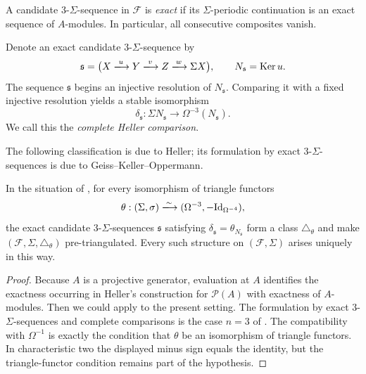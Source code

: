 \documentclass[a4paper,reqno,10pt]{amsart}
\numberwithin{equation}{section}
\newcommand{\cF}{\mathcal F}
\begin{document}
\begin{definition}
\label{def:complete-comparison}
A candidate $3$-$\Sigma$-sequence in $\cF$ is \emph{exact} if its
$\Sigma$-periodic continuation is an exact sequence of $A$-modules. In
particular, all consecutive composites vanish.

Denote an exact candidate
$3$-$\Sigma$-sequence by
\[
 \mathfrak s=
 \bigl(X\xlongrightarrow{u}Y\xlongrightarrow{v}Z
 \xlongrightarrow{w}\Sigma X\bigr),
 \qquad N_{\mathfrak s}=\operatorname{Ker}u.
\]
The sequence $\mathfrak s$ begins an injective resolution of
$N_{\mathfrak s}$. Comparing it with a fixed injective resolution yields a
stable isomorphism
\[
  \delta_{\mathfrak s}:\Sigma N_{\mathfrak s}
  \longrightarrow\Omega^{-3}(N_{\mathfrak s}).
\]
We call this the \emph{complete Heller comparison}. 
\end{definition}

The following classification is due to Heller; its formulation by exact
$3$-$\Sigma$-sequences is due to Geiss--Keller--Oppermann.

\begin{theorem}
\label{thm:heller}
In the situation of , for every isomorphism of
triangle functors
\[
 \theta:(\Sigma,\sigma)\xlongrightarrow{\sim}
(\Omega^{-3},-\mathrm{Id}_{\Omega^{-4}}),
\]
the exact candidate $3$-$\Sigma$-sequences $\mathfrak s$ satisfying $\delta_{\mathfrak s}=\theta_{N_{\mathfrak s}}$
form a class $\triangle_\theta$ and make
$(\cF,\Sigma,\triangle_\theta)$ pre-triangulated. Every such structure on
$(\cF,\Sigma)$ arises uniquely in this way.
\end{theorem}

\begin{proof}
Because $A$ is a projective generator, evaluation at $A$ identifies the
exactness occurring in Heller's construction for $\mathcal P(A)$ with
exactness of $A$-modules. Then we could apply
\cite[Theorem~16.4]{Heller1968} to the present setting. The
formulation by exact $3$-$\Sigma$-sequences and complete comparisons is the
case $n=3$ of
\cite[Lemma~2.3 and Proposition~2.4]{GeissKellerOppermann2013}. The
compatibility with $\Omega^{-1}$ is exactly the condition that $\theta$ be
an isomorphism of triangle functors. In characteristic two the displayed
minus sign equals the identity, but the triangle-functor condition remains
part of the hypothesis.
\end{proof}
\end{document}
